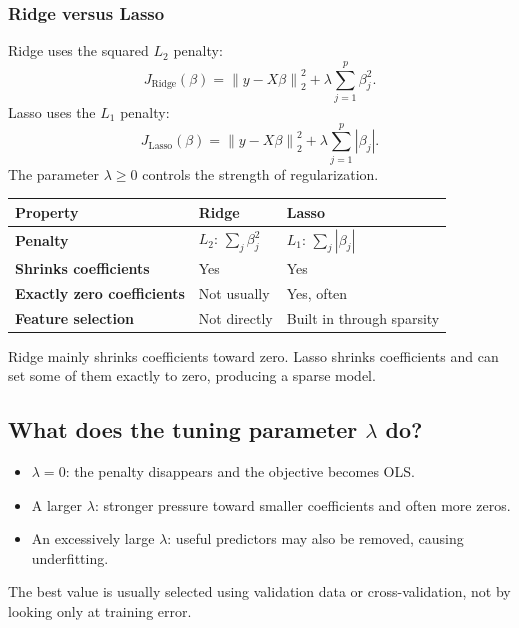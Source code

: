 \documentclass[11pt,a4paper]{article}
\numberwithin{equation}{section}
\newcommand{\norm}[1]{\left\lVert #1\right\rVert}
\newcommand{\abs}[1]{\left|#1\right|}
\begin{document}
\subsubsection{Ridge versus Lasso}
Ridge uses the squared $L_2$ penalty:
\begin{equation}
  J_{\mathrm{Ridge}}(\beta)=\norm{y-X\beta}_2^2+\lambda\sum_{j=1}^p\beta_j^2.
\end{equation}
Lasso uses the $L_1$ penalty:
\begin{equation}
  \boxed{J_{\mathrm{Lasso}}(\beta)=\norm{y-X\beta}_2^2+\lambda\sum_{j=1}^p\abs{\beta_j}.}
  \label{eq:lasso-objective}
\end{equation}
The parameter $\lambda\geq0$ controls the strength of regularization.

\begin{center}
\begin{tabularx}{.94\textwidth}{>{\bfseries}lXX}
\toprule
Property & Ridge & Lasso\\
\midrule
Penalty & $L_2$: $\sum_j\beta_j^2$ & $L_1$: $\sum_j\abs{\beta_j}$\\
Shrinks coefficients & Yes & Yes\\
Exactly zero coefficients & Not usually & Yes, often\\
Feature selection & Not directly & Built in through sparsity\\
\bottomrule
\end{tabularx}
\end{center}

\begin{keyidea}
Ridge mainly shrinks coefficients toward zero. Lasso shrinks coefficients and can set some of them exactly to zero, producing a sparse model.
\end{keyidea}

\subsection{What does the tuning parameter $\lambda$ do?}
\begin{itemize}
  \item $\lambda=0$: the penalty disappears and the objective becomes OLS.
  \item A larger $\lambda$: stronger pressure toward smaller coefficients and often more zeros.
  \item An excessively large $\lambda$: useful predictors may also be removed, causing underfitting.
\end{itemize}
The best value is usually selected using validation data or cross-validation, not by looking only at training error.
\end{document}
